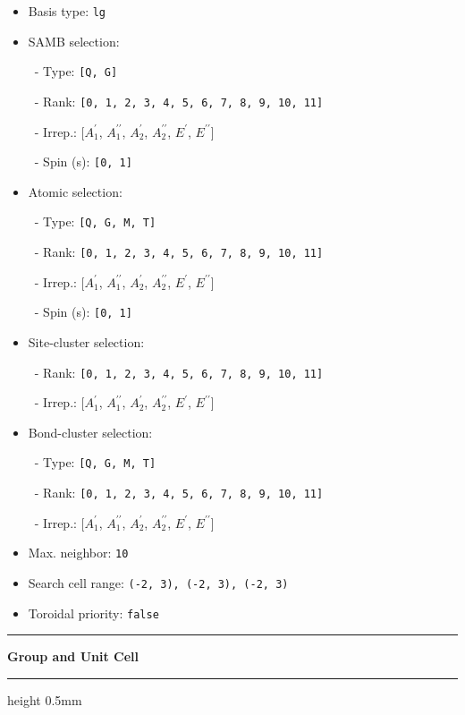 \documentclass[fleqn,10pt,landscape]{jsarticle}
\begin{document}
\begin{itemize}
\item Basis type: \texttt{lg}

\item SAMB selection:

\, - Type: \texttt{[Q, G]}

\, - Rank: \texttt{[0, 1, 2, 3, 4, 5, 6, 7, 8, 9, 10, 11]}

\, - Irrep.: [$A_{1}^{\prime}$, $A_{1}^{\prime\prime}$, $A_{2}^{\prime}$, $A_{2}^{\prime\prime}$, $E^{\prime}$, $E^{\prime\prime}$]

\, - Spin (s): \texttt{[0, 1]}

\item Atomic selection:

\, - Type: \texttt{[Q, G, M, T]}

\, - Rank: \texttt{[0, 1, 2, 3, 4, 5, 6, 7, 8, 9, 10, 11]}

\, - Irrep.: [$A_{1}^{\prime}$, $A_{1}^{\prime\prime}$, $A_{2}^{\prime}$, $A_{2}^{\prime\prime}$, $E^{\prime}$, $E^{\prime\prime}$]

\, - Spin (s): \texttt{[0, 1]}

\item Site-cluster selection:

\, - Rank: \texttt{[0, 1, 2, 3, 4, 5, 6, 7, 8, 9, 10, 11]}

\, - Irrep.: [$A_{1}^{\prime}$, $A_{1}^{\prime\prime}$, $A_{2}^{\prime}$, $A_{2}^{\prime\prime}$, $E^{\prime}$, $E^{\prime\prime}$]

\item Bond-cluster selection:

\, - Type: \texttt{[Q, G, M, T]}

\, - Rank: \texttt{[0, 1, 2, 3, 4, 5, 6, 7, 8, 9, 10, 11]}

\, - Irrep.: [$A_{1}^{\prime}$, $A_{1}^{\prime\prime}$, $A_{2}^{\prime}$, $A_{2}^{\prime\prime}$, $E^{\prime}$, $E^{\prime\prime}$]

\item Max. neighbor: \texttt{10}

\item Search cell range: \texttt{(-2, 3), (-2, 3), (-2, 3)}

\item Toroidal priority: \texttt{false}

\end{itemize}
\vspace{5mm}
\noindent \rule[0.5mm]{5mm}{0.5mm}\hspace{3mm}\textbf{Group and Unit Cell}\hspace{3mm}\leaders\hrule height 0.5mm\hfill\kern0pt
\vspace{3mm}
\end{document}
